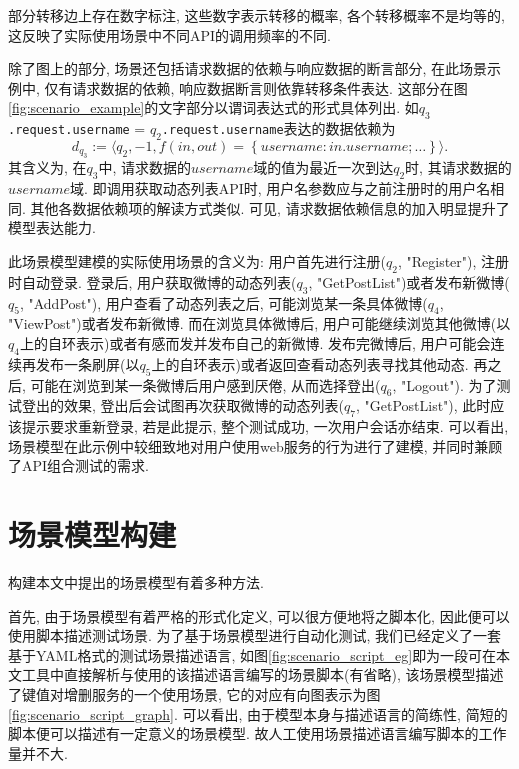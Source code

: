         部分转移边上存在数字标注, 这些数字表示转移的概率, 各个转移概率不是均等的, 这反映了实际使用场景中不同API的调用频率的不同.
        
        除了图上的部分, 场景还包括请求数据的依赖与响应数据的断言部分, 在此场景示例中, 仅有请求数据的依赖, 响应数据断言则依靠转移条件表达. 这部分在图\ref{fig:scenario_example}的文字部分以谓词表达式的形式具体列出. 如$q_3$\texttt{.request.username} = $q_2$\texttt{.request.username}表达的数据依赖为
        \begin{equation}
            d_{q_3} := \langle q_2, -1, f(in, out) = \left\{username: in.username;\dots\right\}\rangle.
        \end{equation}
        其含义为, 在$q_3$中, 请求数据的$username$域的值为最近一次到达$q_2$时, 其请求数据的$username$域. 即调用获取动态列表API时, 用户名参数应与之前注册时的用户名相同. 其他各数据依赖项的解读方式类似. 可见, 请求数据依赖信息的加入明显提升了模型表达能力.
        
        此场景模型建模的实际使用场景的含义为: 用户首先进行注册($q_2$, "Register"), 注册时自动登录. 登录后, 用户获取微博的动态列表($q_3$, "GetPostList")或者发布新微博($q_5$, "AddPost"), 用户查看了动态列表之后, 可能浏览某一条具体微博($q_4$, "ViewPost")或者发布新微博. 而在浏览具体微博后, 用户可能继续浏览其他微博(以$q_4$上的自环表示)或者有感而发并发布自己的新微博. 发布完微博后, 用户可能会连续再发布一条刷屏(以$q_5$上的自环表示)或者返回查看动态列表寻找其他动态. 再之后, 可能在浏览到某一条微博后用户感到厌倦, 从而选择登出($q_6$, "Logout"). 为了测试登出的效果, 登出后会试图再次获取微博的动态列表($q_7$, "GetPostList"), 此时应该提示要求重新登录, 若是此提示, 整个测试成功, 一次用户会话亦结束. 可以看出, 场景模型在此示例中较细致地对用户使用web服务的行为进行了建模, 并同时兼顾了API组合测试的需求.
    
    \section{场景模型构建}
        \label{sec:scenario_build}
    
        构建本文中提出的场景模型有着多种方法.
        
        首先, 由于场景模型有着严格的形式化定义, 可以很方便地将之脚本化, 因此便可以使用脚本描述测试场景. 为了基于场景模型进行自动化测试, 我们已经定义了一套基于YAML格式的测试场景描述语言, 如图\ref{fig:scenario_script_eg}即为一段可在本文工具中直接解析与使用的该描述语言编写的场景脚本(有省略), 该场景模型描述了键值对增删服务的一个使用场景, 它的对应有向图表示为图\ref{fig:scenario_script_graph}. 可以看出, 由于模型本身与描述语言的简练性, 简短的脚本便可以描述有一定意义的场景模型.  故人工使用场景描述语言编写脚本的工作量并不大.
        
